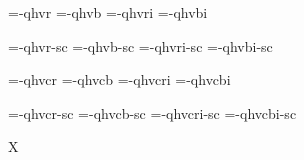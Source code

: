 

\ifx\sizespec\undefined \def\sizespec{}\fi
\ifx\font\corkencoded {}\else {}\fi

\ifx\font\unicoded  
   \def\famname{texgyreheroscn} 
   \let\tenrmn=\tenrm \let\tenbfn=\tenbf \let\tenitn=\tenit \let\tenbin=\tenbi
   \let\tenrmnc=\tenrmc \let\tenbfnc=\tenbfc \let\tenitnc=\tenitc \let\tenbinc=\tenbic
   \def\famname{texgyreheros} 
\else

\font\tenrm=\tmp-qhvr  \sizespec
\font\tenbf=\tmp-qhvb  \sizespec
\font\tenit=\tmp-qhvri \sizespec
\font\tenbi=\tmp-qhvbi \sizespec

\font\tenrmc=\tmp-qhvr-sc  \sizespec
\font\tenbfc=\tmp-qhvb-sc  \sizespec
\font\tenitc=\tmp-qhvri-sc \sizespec
\font\tenbic=\tmp-qhvbi-sc \sizespec

\fi

\tenrm

\font\tenrmn=\tmp-qhvcr  \sizespec
\font\tenbfn=\tmp-qhvcb  \sizespec
\font\tenitn=\tmp-qhvcri \sizespec
\font\tenbin=\tmp-qhvcbi \sizespec

\font\tenrmnc=\tmp-qhvcr-sc  \sizespec
\font\tenbfnc=\tmp-qhvcb-sc  \sizespec
\font\tenitnc=\tmp-qhvcri-sc \sizespec
\font\tenbinc=\tmp-qhvcbi-sc \sizespec

\def\caps#1{{\escapechar=-1 \expandafter}%
  \expandafter\csname\expandafter\tenonlytext\string#1c\endcsname}
\def\tenonlytext{ten}

\def\narrow{%
  \let\tenrm=\tenrmn \let\tenbf=\tenbfn
  \let\tenit=\tenitn \let\tenbi=\tenbin 
  \let\tenrmc=\tenrmnc \let\tenbfc=\tenbfnc
  \let\tenitc=\tenitnc \let\tenbic=\tenbinc \tenrm}

\ifx\font\corkencoded\else \ifx\font\unicoded\else  \fi\fi
\ifx\mathpreloaded X\else  \fi                     


